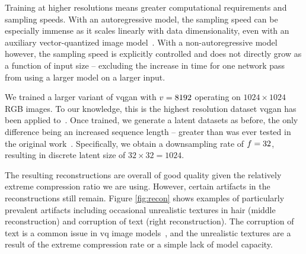 Training at higher resolutions means greater computational requirements and
sampling speeds. With an autoregressive model, the sampling speed can be
especially immense as it scales linearly with data dimensionality, even with an
auxiliary vector-quantized image model~\cite{esser2021taming}. With a
non-autoregressive model however, the sampling speed is explicitly controlled
and does not directly grow as a function of input size -- excluding the
increase in time for one network pass from using a larger model on a larger input.

We trained a larger variant of \gls{vqgan} with $v = 8192$ operating on
$1024 \times 1024$ RGB images. To our knowledge, this is the highest resolution
dataset \gls{vqgan} has been applied to~\cite{esser2021taming}. Once trained,
we generate a latent datasets as before, the only difference being an increased
sequence length -- greater than was ever tested in the original
work~\cite{savinov2022stepunrolled}. Specifically, we obtain a downsampling rate
of $f=32$, resulting in discrete latent size of $32 \times 32 =
1024$.

The resulting reconstructions are overall of good quality given the relatively
extreme compression ratio we are using. However, certain artifacts in the
reconstructions still remain. Figure \ref{fig:recon} shows examples of
particularly prevalent artifacts including occasional unrealistic textures in
hair (middle reconstruction) and corruption of text (right reconstruction). The
corruption of text is a common issue in \gls{vq} image
models~\cite{ramesh2021dalle}, and the unrealistic textures are a result of the
extreme compression rate or a simple lack of model capacity.

